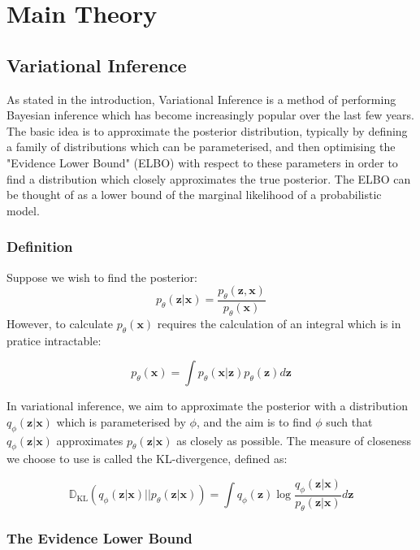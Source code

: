 \chapter{Main Theory}
\section{Variational Inference}
As stated in the introduction, Variational Inference is a method of performing Bayesian inference which has become increasingly popular over the last few years. 
The basic idea is to approximate the posterior distribution, typically by defining a family of distributions which can be parameterised, and then optimising the "Evidence Lower Bound" (ELBO) with respect to these parameters in order to find a distribution which closely approximates the true posterior. The ELBO can be thought of as a lower bound of the marginal likelihood of a probabilistic model.

\subsection{Definition}
Suppose we wish to find the posterior:
\begin{equation}
	p_\theta(\mathbf{z|x}) = \frac{p_\theta(\mathbf{z, x})}{p_\theta(\mathbf{x})}
\end{equation}
However, to calculate $p_\theta(\mathbf{x})$ requires the calculation of an integral which is in pratice intractable:

\begin{equation}
	p_\theta(\mathbf{x}) = \int p_\theta(\mathbf{x|z})p_\theta(\mathbf{z}) d\mathbf{z}
\end{equation}

In variational inference, we aim to approximate the posterior with a distribution $q_\phi(\mathbf{z|x})$ which is parameterised by $\phi$, and the aim is to find $\phi$ such that $q_\phi(\mathbf{z|x})$ approximates $p_\theta(\mathbf{z|x})$ as closely as possible. The measure of closeness we choose to use is called the KL-divergence, defined as:
 
 \begin{equation}
	\mathbb{D}_{\text{KL}}(q_\phi(\mathbf{z|x})||p_\theta(\mathbf{z|x})) = \int q_\phi(\mathbf{z}) \log \frac{q_\phi(\mathbf{z|x})}{p_\theta(\mathbf{z|x})} d\mathbf{z}
\end{equation}

\subsection{The Evidence Lower Bound}

